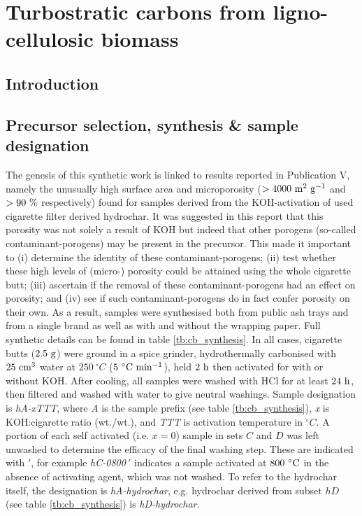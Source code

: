\chapter{Turbostratic carbons from ligno-cellulosic biomass}
\label{ch:syntheses}

\newpage

\section{Introduction}

\section{Precursor selection, synthesis \& sample designation}

The genesis of this synthetic work is linked to results reported in Publication V, namely the unusually high surface area and microporosity ($ \rm > 4000\ m^2\ g^{-1}$ and $\rm > 90\ \%$ respectively) found for samples derived from the KOH-activation of used cigarette filter derived hydrochar. It was suggested in this report that this porosity was not solely a result of KOH but indeed that other porogens (so-called contaminant-porogens) may be present in the precursor. This made it important to (i) determine the identity of these  contaminant-porogens; (ii) test whether these high levels of (micro-) porosity could be attained using the whole cigarette butt; (iii) ascertain if the removal of these contaminant-porogens had an effect on porosity; and (iv) see if such contaminant-porogens do in fact confer porosity on their own. As a result, samples were synthesised both from public ash trays and from a single brand as well as with and without the wrapping paper. Full synthetic details can be found in table \ref{tb:cb_synthesis}. In all cases, cigarette butts ($\rm 2.5\ g$) were ground in a spice grinder, hydrothermally carbonised with $\rm 25\ cm^3$ water at $250\ ^{\circ}C$ ($\rm 5\ ^{\circ}C\ min^{-1}$), held $\rm 2\ h$ then activated for with or without KOH. After cooling, all samples were washed with HCl for at least $\rm 24\ h$, then filtered and washed with water to give neutral washings. Sample designation is \textit{hA-xTTT}, where \textit{A} is the sample prefix (see table \ref{tb:cb_synthesis}), \textit{x} is KOH:cigarette ratio (wt./wt.), and \textit{TTT} is activation temperature in $^{\circ}C$. A portion of each self activated (i.e. $x = 0$) sample in sets $C$ and $D$ was left unwashed to determine the efficacy of the final washing step. These are indicated with $'$, for example \textit{hC-0800$\ '$} indicates a sample activated at $\rm 800\ ^{\circ}C$ in the absence of activating agent, which was not washed. To refer to the hydrochar itself, the designation is \textit{hA-hydrochar}, e.g. hydrochar derived from subset $hD$ (see table \ref{tb:cb_synthesis}) is \textit{hD-hydrochar}.

